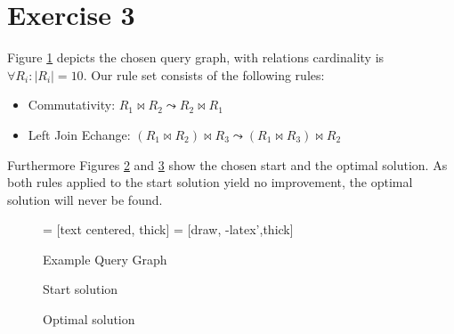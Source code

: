 \documentclass[paper=a4, fontsize=11pt]{scrartcl} %
\numberwithin{equation}{section} %
\numberwithin{figure}{section} %
\numberwithin{table}{section} %
\begin{document}
\section{Exercise 3}
Figure \ref{qg} depicts the chosen query graph, with relations cardinality is $\forall R_i: |R_i|=10$. Our rule set consists of the following rules: 
\begin{itemize}
	\item Commutativity:	$R_1 \Join R_2 \leadsto R_2 \Join R_1$
	\item Left Join Echange: $(R_1\Join R_2) \Join R_3 \leadsto (R_1\Join R_3) \Join R_2$
\end{itemize}
Furthermore Figures \ref{startsolution} and \ref{optimalsolution} show the chosen start and the optimal solution. As both rules applied to the start solution yield no improvement, the optimal solution will never be found.

\begin{figure}[H]
	\centering
		 = [text centered, thick]
		 = [draw, -latex',thick]  

	\caption{Example Query Graph}
	  \label{qg}
\end{figure}

\begin{figure}[H]
\centering
\caption{Start solution}
  \label{startsolution}
\end{figure}

\begin{figure}[H]
\centering
\caption{Optimal solution}
  \label{optimalsolution}
\end{figure}
\end{document}
